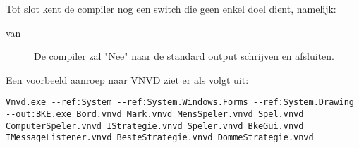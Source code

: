 Tot slot kent de compiler nog een switch die geen enkel doel dient, namelijk:

\begin{description}
	\item[\textminus\textminus{}van] De compiler zal "Nee" naar de standard output schrijven en afsluiten.
\end{description}

Een voorbeeld aanroep naar VNVD ziet er als volgt uit:

\begin{lstlisting}
Vnvd.exe --ref:System --ref:System.Windows.Forms --ref:System.Drawing --out:BKE.exe Bord.vnvd Mark.vnvd MensSpeler.vnvd Spel.vnvd ComputerSpeler.vnvd IStrategie.vnvd Speler.vnvd BkeGui.vnvd IMessageListener.vnvd BesteStrategie.vnvd DommeStrategie.vnvd
\end{lstlisting}
